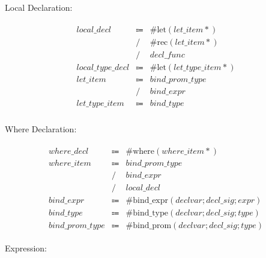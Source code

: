 Local Declaration:

\begin{align*}
    \begin{array}{rcll}
        \mathit{local\_decl}
        &\Coloneq &\mathrm{\#let}(\mathit{let\_item}{*}) \\
        &\mathrel{/} &\mathrm{\#rec}(\mathit{let\_item}{*}) \\
        &\mathrel{/} &\mathit{decl\_func} \\
        \mathit{local\_type\_decl}
        &\Coloneq &\mathrm{\#let}(\mathit{let\_type\_item}{*}) \\
        \mathit{let\_item}
        &\Coloneq &\mathit{bind\_prom\_type} \\
        &\mathrel{/} &\mathit{bind\_expr} \\
        \mathit{let\_type\_item}
        &\Coloneq &\mathit{bind\_type} \\
    \end{array}
\end{align*}

Where Declaration:

\begin{align*}
    \begin{array}{rcll}
        \mathit{where\_decl}
        &\Coloneq &\mathrm{\#where}(\mathit{where\_item}{*}) \\
        \mathit{where\_item}
        &\Coloneq &\mathit{bind\_prom\_type} \\
        &\mathrel{/} &\mathit{bind\_expr} \\
        &\mathrel{/} &\mathit{local\_decl} \\
        \mathit{bind\_expr}
        &\Coloneq &\mathrm{\#bind\_expr}(\mathit{declvar}; \mathit{decl\_sig}; \mathit{expr}) \\
        \mathit{bind\_type}
        &\Coloneq &\mathrm{\#bind\_type}(\mathit{declvar}; \mathit{decl\_sig}; \mathit{type}) \\
        \mathit{bind\_prom\_type}
        &\Coloneq &\mathrm{\#bind\_prom}(\mathit{declvar}; \mathit{decl\_sig}; \mathit{type})
    \end{array}
\end{align*}

Expression:


